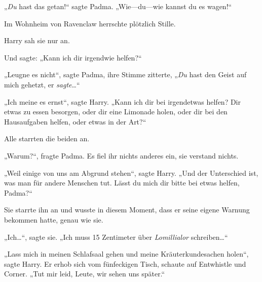 „\emph{Du} hast das getan!“ sagte Padma. „Wie—du—wie kannst du es wagen!“

Im Wohnheim von Ravenclaw herrschte plötzlich Stille.

Harry sah sie nur an.

Und sagte: „Kann ich dir irgendwie helfen?“

„Leugne es nicht“, sagte Padma, ihre Stimme zitterte, „\emph{Du} hast den Geist auf mich gehetzt, er \emph{sagte}…“

„Ich meine es ernst“, sagte Harry. „Kann ich dir bei irgendetwas helfen? Dir etwas zu essen besorgen, oder dir eine Limonade holen, oder dir bei den Hausaufgaben helfen, oder etwas in der Art?“

Alle starrten die beiden an.

„Warum?“, fragte Padma. Es fiel ihr nichts anderes ein, sie verstand nichts.

„Weil einige von uns am Abgrund stehen“, sagte Harry. „Und der Unterschied ist, was man für andere Menschen tut. Lässt du mich dir bitte bei etwas helfen, Padma?“

Sie starrte ihn an und wusste in diesem Moment, dass er seine eigene Warnung bekommen hatte, genau wie sie.

„Ich…“, sagte sie. „Ich muss 15 Zentimeter über \emph{Lomillialor} schreiben…“

„Lass mich in meinen Schlafsaal gehen und meine Kräuterkundesachen holen“, sagte Harry. Er erhob sich vom fünfeckigen Tisch, schaute auf Entwhistle und Corner. „Tut mir leid, Leute, wir sehen uns später.“

